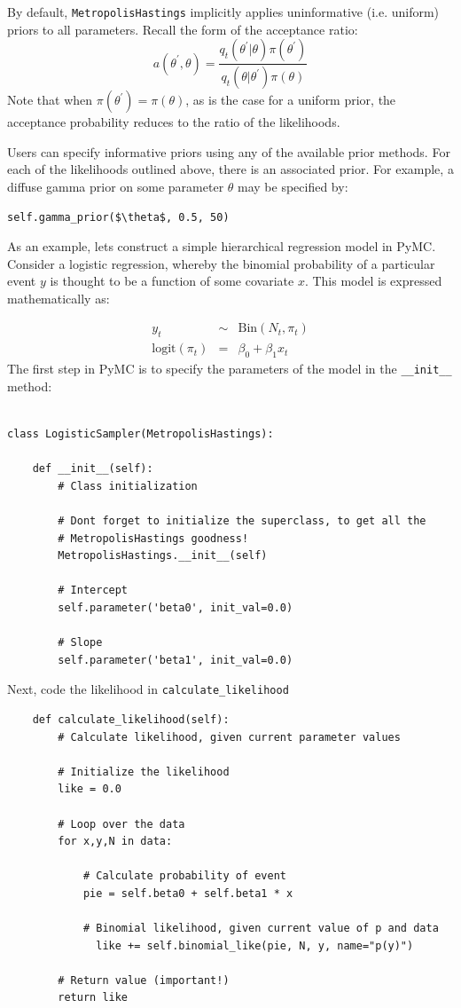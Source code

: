 \documentclass[]{book}
\begin{document}
By default, \verb=MetropolisHastings= implicitly applies uninformative (i.e. uniform) priors to all parameters. Recall the form of the acceptance ratio:
\[
a(\theta^{\prime},\theta) = \frac{q_t(\theta^{\prime} | \theta) \pi(\theta^{\prime})}{q_t(\theta | \theta^{\prime}) \pi(\theta)}
\]
Note that when $\pi(\theta^{\prime}) = \pi(\theta)$, as is the case for a uniform prior, the acceptance probability reduces to the ratio of the likelihoods.

Users can specify informative priors using any of the available prior methods. For each of the likelihoods outlined above, there is an associated prior. For example, a diffuse gamma prior on some parameter $\theta$ may be specified by:
\begin{verbatim}
self.gamma_prior($\theta$, 0.5, 50)
\end{verbatim}

As an example, lets construct a simple hierarchical regression model in PyMC. Consider a logistic regression, whereby the binomial probability of a particular event $y$ is thought to be a function of some covariate $x$. This model is expressed mathematically as:

\begin{eqnarray*}
	y_t &\sim& \mbox{Bin}(N_t, \pi_t) \\
	\mbox{logit}(\pi_t) &=& \beta_0 + \beta_1 x_t 
\end{eqnarray*}
The first step in PyMC is to specify the parameters of the model in the \verb=__init__= method:
\begin{verbatim}
	
class LogisticSampler(MetropolisHastings):

    def __init__(self):
        # Class initialization
		
        # Dont forget to initialize the superclass, to get all the 
        # MetropolisHastings goodness!
        MetropolisHastings.__init__(self)
        		
        # Intercept
        self.parameter('beta0', init_val=0.0)
        		
        # Slope
        self.parameter('beta1', init_val=0.0)
\end{verbatim}
Next, code the likelihood in \verb=calculate_likelihood=
\begin{verbatim}
    def calculate_likelihood(self):
        # Calculate likelihood, given current parameter values
        
        # Initialize the likelihood
        like = 0.0
        
        # Loop over the data
        for x,y,N in data:
        
            # Calculate probability of event
            pie = self.beta0 + self.beta1 * x
        
            # Binomial likelihood, given current value of p and data
        	  like += self.binomial_like(pie, N, y, name="p(y)") 
        
        # Return value (important!)
        return like
\end{verbatim}
\end{document}
